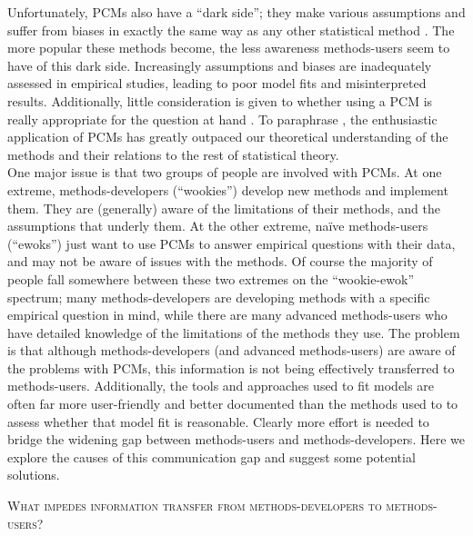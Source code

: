 \documentclass[a4paper,12pt]{article}
\renewcommand{\section}[1]{
  \bigskip
  \begin{center}
  \begin{Large}
  \normalfont\scshape #1
  \medskip
  \end{Large}
  \end{center}
}
\begin{document}
Unfortunately, PCMs also have a ``dark side''; they make various assumptions and suffer from biases in exactly the same way as any other statistical method \citep{freckleton2009seven,boettiger2012your}. 
The more popular these methods become, the less awareness methods-users seem to have of this dark side. Increasingly assumptions and biases are inadequately assessed in empirical studies, leading to poor model fits and misinterpreted results. 
Additionally, little consideration is given to whether using a PCM is really appropriate for the question at hand \citep{losos2011seeing}. 
To paraphrase \citet{blomberg2012independent}, the enthusiastic application of PCMs has greatly outpaced our theoretical understanding of the methods and their relations to the rest of statistical theory.\\


One major issue is that two groups of people are involved with PCMs. 
At one extreme, methods-developers (``wookies'') develop new methods and implement them. They are (generally) aware of the limitations of their methods, and the assumptions that underly them. 
At the other extreme, na\"{i}ve methods-users (``ewoks'') just want to use PCMs to answer empirical questions with their data, and may not be aware of issues with the methods. 
Of course the majority of people fall somewhere between these two extremes on the ``wookie-ewok'' spectrum; many methods-developers are developing methods with a specific empirical question in mind, while there are many advanced methods-users who have detailed knowledge of the limitations of the methods they use. 
The problem is that although methods-developers (and advanced methods-users) are aware of the problems with PCMs, this information is not being effectively transferred to methods-users. Additionally, the tools and approaches used to fit models are often far more user-friendly and better documented than the methods used to to assess whether that model fit is reasonable. 
Clearly more effort is needed to bridge the widening gap between methods-users and methods-developers. Here we explore the causes of this communication gap and suggest some potential solutions. %

\section{What impedes information transfer from methods-developers to methods-users?}
\end{document}
